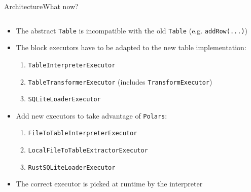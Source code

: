 \begin{frame}[t]{Architecture}{What now?} %
	\begin{columns}[T]
		\begin{column}{0.5\linewidth}
			\begin{itemize}
				\item<2-> The abstract \Verb|Table| is incompatible with the old \Verb|Table| (e.g. \Verb|addRow(...)|)
				\item<3-> The block executors have to be adapted to the new table implementation:
				      \begin{enumerate}[<4->]
					      \item \Verb|TableInterpreterExecutor|
					      \item \Verb|TableTransformerExecutor| (includes \Verb|TransformExecutor|)
					      \item \Verb|SQLiteLoaderExecutor|
				      \end{enumerate}
				\item<5-> Add new executors to take advantage of \Verb|Polars|:
				      \begin{enumerate}
					      \item \Verb|FileToTableInterpreterExecutor|
					      \item \Verb|LocalFileToTableExtractorExecutor|
					      \item \Verb|RustSQLiteLoaderExecutor|
				      \end{enumerate}
				\item<6-> The correct executor is picked at runtime by the interpreter
			\end{itemize}
		\end{column}
		\hfill
		\begin{column}{0.5\linewidth}
			\only<1-2> {
				
			}
		\end{column}
	\end{columns}
\end{frame}
